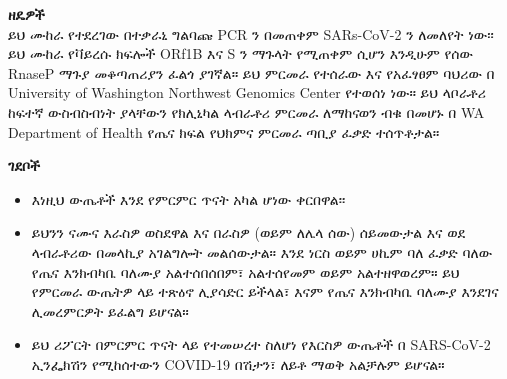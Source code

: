 \documentclass[10pt]{article}
\begin{document}
\textbf{ዘዴዎች}\\
ይህ ሙከራ የተደረገው በተቃራኒ ግልባጩ PCR ን በመጠቀም SARs-CoV-2 ን ለመለየት ነው፡፡ ይህ ሙከራ የቫይረሱ
ክፍሎች ORf1B እና S ን ማጉላት የሚጠቀም ሲሆን እንዲሁም የሰው RnaseP ማጉያ መቆጣጠሪያን ፈልጎ ያገኛል።
ይህ ምርመራ የተሰራው እና የአፈፃፀም ባህሪው በ University of Washington Northwest Genomics
Center የተወሰነ ነው። ይህ ላቦራቶሪ ከፍተኛ ውስብስብነት ያላቸውን የክሊኒካል ላብራቶሪ ምርመራ ለማከናወን ብቁ
በመሆኑ በ  WA Department of Health የጤና ክፍል የህክምና ምርመራ ጣቢያ ፈቃድ ተሰጥቶታል።

\textbf{ገደቦች}

\begin{itemize}

\item

  እነዚህ ውጤቶች እንደ የምርምር ጥናት አካል ሆነው ቀርበዋል፡፡

\item

  ይህንን ናሙና እራስዎ ወስደዋል እና በራስዎ (ወይም ለሌላ ሰው) ሰይመውታል እና ወደ ላብራቶሪው በመላኪያ
  አገልግሎት መልሰውታል። እንደ ነርስ ወይም ሀኪም ባለ ፈቃድ ባለው የጤና እንክብካቤ ባለሙያ አልተሰበሰበም፣
  አልተሰየመም ወይም አልተዘዋወረም። ይህ የምርመራ ውጤትዎ ላይ ተጽዕኖ ሊያሳድር ይችላል፣ እናም የጤና እንክብካቤ
  ባለሙያ እንደገና ሊመረምርዎት ይፈልግ ይሆናል።

\item

  ይህ ሪፖርት በምርምር ጥናት ላይ የተመሠረተ ስለሆነ የእርስዎ ውጤቶች በ SARS-CoV-2 ኢንፌክሽን የሚከሰተውን
  COVID-19 በሽታን፣ ለይቶ ማወቅ አልቻሉም ይሆናል።

\end{itemize}
\end{document}

